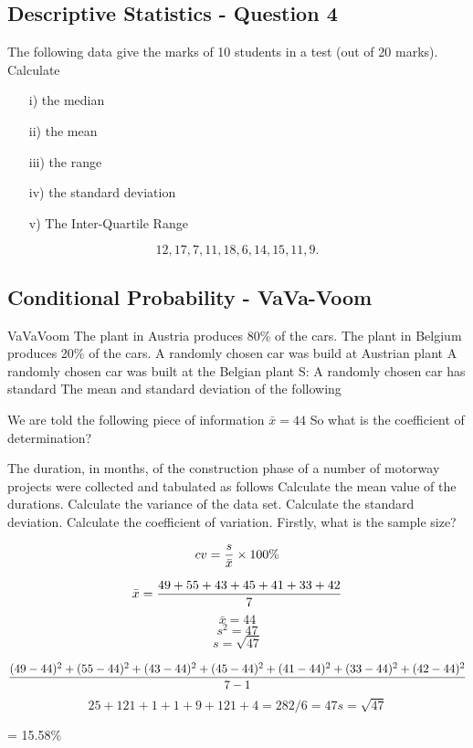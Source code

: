 \documentclass[]{report}
\begin{document}
\subsection{Descriptive Statistics - Question 4}
The following data give the marks of 10 students in a test (out of 20 marks). Calculate
\begin{itemize}
	
	\item[i)] the median    
	\item[ii)] the mean     
	\item[iii)] the range    
	\item[iv)] the standard deviation 
	\item[v)] The Inter-Quartile Range
\end{itemize}
\[12, 17, 7, 11, 18, 6, 14, 15, 11, 9.\]



\subsection{Conditional Probability - VaVa-Voom}
VaVaVoom
The plant in Austria produces 80\% of the cars.
The plant in Belgium produces 20\% of the cars.
A randomly chosen car was build at Austrian plant
A randomly chosen car was built at the Belgian plant
S: A randomly chosen car has standard
The mean and standard deviation of the following

We are told the following piece of information $\bar{x} = 44$
So what is the coefficient of determination?

The duration, in months, of the construction phase of a number of motorway projects
were collected and tabulated as follows
Calculate the mean value of the durations.
Calculate the variance of the data set.
Calculate the standard deviation.
Calculate the coefficient of variation.
Firstly, what is the sample size?

\[cv= {s \over \bar{x}} \times 100\%\]

\[ \bar{x} = {49 + 55 + 43 + 45 + 41 +33 + 42 \over 7} \]
\[\bar{x} = 44\]
\[s^2 = 47\]
\[s = \sqrt{47}\]

\[{(49-44)^2 + (55-44)^2 + (43-44)^2 + (45-44)^2 + (41-44)^2 + (33-44)^2 + (42-44)^2 \over 7-1}\]
\[
25 + 121 + 1 + 1 + 9 + 121 + 4
={282/6} = 47
s = \sqrt{47}\]

= 15.58\%
\end{document}
